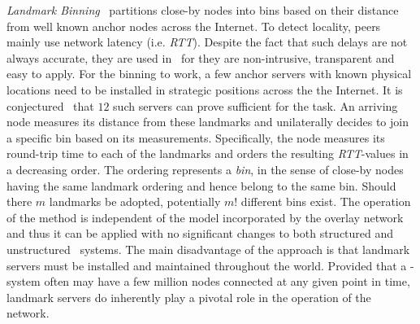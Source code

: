 \emph{Landmark Binning}~\cite{RHMKS2002} partitions close-by nodes 
into bins based on their distance from well known anchor nodes across the
Internet.%
To detect locality, peers mainly use network latency (i.e. \emph{RTT}).
Despite the fact that such delays are not always accurate,
they are used in~\cite{RHMKS2002} for they are 
non-intrusive, transparent and easy to apply.
For the binning to work, a few anchor servers with known
physical locations need to be installed in strategic positions 
across the the Internet. 
It is conjectured~\cite{RHMKS2002} that $12$ such servers can prove
sufficient for the task.
An arriving node measures its distance from these landmarks
and unilaterally decides to join a specific bin based on its measurements.
Specifically, the node measures its round-trip time to each of the landmarks and
orders the resulting \emph{RTT}-values in a decreasing order. 
The ordering represents a \emph{bin},
in the sense of close-by nodes having the same landmark ordering and hence
belong to the same bin. 
Should there $m$ landmarks be adopted, potentially $m!$  different bins exist.
The operation of the method is independent of the model 
incorporated by the overlay network and thus it can be
applied with no significant changes to 
both structured and unstructured \p\ systems. 
The main disadvantage of the approach is that 
landmark servers must be installed and maintained throughout the world.
Provided that a \p-system often may have a few million nodes 
connected at any given point in time, landmark servers do 
inherently play a pivotal role in the operation of the network.
